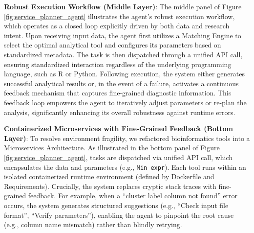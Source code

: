 \documentclass[a4,center,fleqn]{NAR}
\begin{document}
\textbf{Robust Execution Workflow (Middle Layer)}: 
The middle panel of Figure \ref{fig:service_planner_agent} illustrates the agent's robust execution workflow, which operates as a closed loop explicitly driven by both data and research intent. Upon receiving input data, the agent first utilizes a Matching Engine to select the optimal analytical tool and configures its parameters based on standardized metadata. The task is then dispatched through a unified API call, ensuring standardized interaction regardless of the underlying programming language, such as R or Python. Following execution, the system either generates successful analytical results or, in the event of a failure, activates a continuous feedback mechanism that captures fine-grained diagnostic information. This feedback loop empowers the agent to iteratively adjust parameters or re-plan the analysis, significantly enhancing its overall robustness against runtime errors.


\textbf{Containerized Microservices with Fine-Grained Feedback (Bottom Layer)}:
To resolve environment fragility, we refactored bioinformatics tools into a Microservices Architecture. As illustrated in the bottom panel of Figure \ref{fig:service_planner_agent}, tasks are dispatched via unified API call, which encapsulates the data and parameters (e.g., \texttt{Min expr}). Each tool runs within an isolated containerized runtime environment (defined by Dockerfile and Requirements). Crucially, the system replaces cryptic stack traces with fine-grained feedback. For example, when a ``cluster label column not found'' error occurs, the system generates structured suggestions (e.g., ``Check input file format'', ``Verify parameters''), enabling the agent to pinpoint the root cause (e.g., column name mismatch) rather than blindly retrying.
\end{document}
